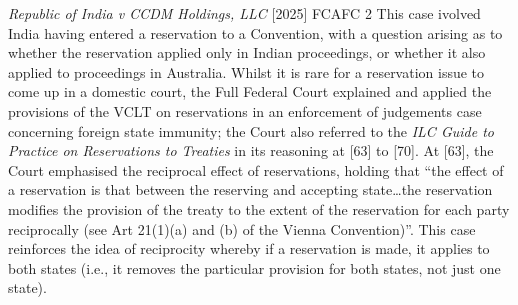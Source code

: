 \begin{casedetails}{\textit{Republic of India v CCDM Holdings, LLC} [2025] FCAFC 2}\label{case:India v CCDM}
    \flushleft
    This case ivolved India having entered a reservation to a Convention, with a question arising as to whether the reservation applied only in Indian proceedings, or whether it also applied to proceedings in Australia. Whilst it is rare for a reservation issue to come up in a domestic court, the Full Federal Court explained and applied the provisions of the VCLT on reservations in an enforcement of judgements case concerning foreign state immunity; the Court also referred to the \textit{ILC Guide to Practice on Reservations to Treaties} in its reasoning at [63] to [70]. At [63], the Court emphasised the reciprocal effect of reservations, holding that ``the effect of a reservation is that between the reserving and accepting state…the reservation modifies the provision of the treaty to the extent of the reservation for each party reciprocally (see Art 21(1)(a) and (b) of the Vienna Convention)''. This case reinforces the idea of reciprocity whereby if a reservation is made, it applies to both states (i.e., it removes the particular provision for both states, not just one state).
\end{casedetails}

